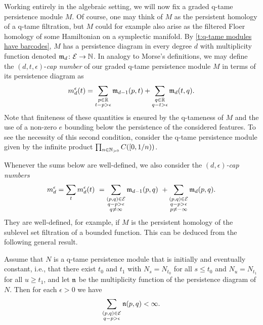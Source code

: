 Working entirely in the algebraic setting, we will now fix a graded q-tame persistence module $M$.
Of course, one may think of $M$ as the persistent homology of a q-tame filtration, but $M$ could for example also arise as the filtered Floer homology of some Hamiltonian on a symplectic manifold.
By \cref{t:q-tame modules have barcodes}, $M$ has a persistence diagram in every degree $d$ with multiplicity function denoted $\mathfrak{m}_d \colon \mathcal{E} \to \mathbb{N}$.
In analogy to Morse's definitions, we may define the $(d, t, \epsilon)$-\emph{cap number} of our graded q-tame persistence module $M$ in terms of its persistence diagram as
\begin{equation*}
m_{d}^{\epsilon}(t) =
\sum_{\substack{p \in \mathbb{R} \\ t - p > \epsilon}} \mathfrak{m}_{d-1}(p, t) +
\sum_{\substack{q \in \mathbb{R} \\ q - t > \epsilon}} \mathfrak{m}_d(t, q).
\end{equation*}
Note that finiteness of these quantities is ensured by the q-tameness of $M$ and the use of a non-zero $e$ bounding below the persistence of the considered features.
To see the necessity of this second condition, consider the q-tame persistence module given by the infinite product $\prod_{n \in \mathbb{N}_{> 0}} C([0,1/n))$.

Whenever the sums below are well-defined, we also consider the \emph{$(d,\epsilon)$-cap numbers} 
\begin{equation} \label{e:cap numbers}
m_{d}^{\epsilon} =
\sum_{t} m_{d}^{\epsilon}(t) \ =
\sum_{\substack{(p,q) \in \mathcal{E} \\ q - p > \epsilon \\ q \neq \infty}} \mathfrak{m}_{d-1}(p,q) \ +
\sum_{\substack{(p,q) \in \mathcal{E} \\ q - p > \epsilon \\ p \neq -\infty}}\mathfrak{m}_d(p,q).
\end{equation} 
They are well-defined, for example, if $M$ is the persistent homology of the sublevel set filtration of a bounded function.
This can be deduced from the following general result.

\begin{thm}
	Assume that $N$ is a q-tame persistence module that is initially and eventually constant, i.e., that there exist $t_0$ and $t_1$ with $N_s = N_{t_0}$ for all $s \leq t_0$ and $N_u = N_{t_1}$ for all $u \geq t_1$, and let $\mathfrak{n}$ be the multiplicity function of the persistence diagram of $N$.
	Then for each $\epsilon > 0$ we have 
	\begin{equation*}
	\sum_{ \substack{ (p,q) \in \mathcal{E} \\ q-p > \epsilon } } \mathfrak{n} (p,q) < \infty.
	\end{equation*}
\end{thm}

